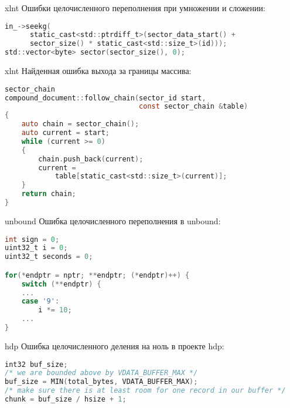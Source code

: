 \documentclass[10pt]{beamer}
\begin{document}
\begin{frame}[fragile]{xlnt}
Ошибки целочисленного переполнения при умножении и сложении:
\tiny
\begin{lstlisting}[language=C, basicstyle=\small\ttfamily,
                   xleftmargin=2em,
                   captionpos=b,
                   label=lst:xlnt-overflow]
in_->seekg(
      static_cast<std::ptrdiff_t>(sector_data_start() +
      sector_size() * static_cast<std::size_t>(id)));
std::vector<byte> sector(sector_size(), 0);
\end{lstlisting}
\end{frame}

\begin{frame}[fragile]{xlnt}
Найденная ошибка выхода за границы массива:
\begin{lstlisting}[language=C, basicstyle=\small\ttfamily,
                   xleftmargin=2em,
                   captionpos=b,
                   label=lst:xlnt-oob]
sector_chain
compound_document::follow_chain(sector_id start,
                                const sector_chain &table)
{
    auto chain = sector_chain();
    auto current = start;
    while (current >= 0)
    {
        chain.push_back(current);
        current =
            table[static_cast<std::size_t>(current)];
    }
    return chain;
}
\end{lstlisting}
\end{frame}

\begin{frame}[fragile]{unbound}
Ошибка целочисленного переполнения в unbound:
\begin{lstlisting}[language=C, basicstyle=\small\ttfamily,
                   xleftmargin=2em,
                   captionpos=b,
                   label=lst:unbound_overflow]
int sign = 0;
uint32_t i = 0;
uint32_t seconds = 0;

for(*endptr = nptr; **endptr; (*endptr)++) {
    switch (**endptr) {
    ...
    case '9':
        i *= 10;
    ...
}
\end{lstlisting}
\end{frame}

\begin{frame}[fragile]{hdp}
Ошибка целочисленного деления на ноль в проекте hdp:
\begin{lstlisting}[language=C, basicstyle=\small\ttfamily,
                   xleftmargin=2em,
                   captionpos=b,
                   label=lst:hdp-zerodiv]
int32 buf_size;
/* we are bounded above by VDATA_BUFFER_MAX */
buf_size = MIN(total_bytes, VDATA_BUFFER_MAX);
/* make sure there is at least room for one record in our buffer */
chunk = buf_size / hsize + 1;
\end{lstlisting}
\end{frame}
\end{document}
